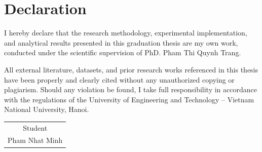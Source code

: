 \chapter*{Declaration}
I hereby declare that the research methodology, experimental implementation, and analytical results presented in this graduation thesis are my own work, conducted under the scientific supervision of PhD. Pham Thi Quynh Trang.

All external literature, datasets, and prior research works referenced in this thesis have been properly and clearly cited without any unauthorized copying or plagiarism. Should any violation be found, I take full responsibility in accordance with the regulations of the University of Engineering and Technology -- Vietnam National University, Hanoi.

\vspace{1cm}
\begin{flushright}
\begin{tabular}{@{}c@{}}
Student\\[1cm]
Pham Nhat Minh
\end{tabular}
\end{flushright}


